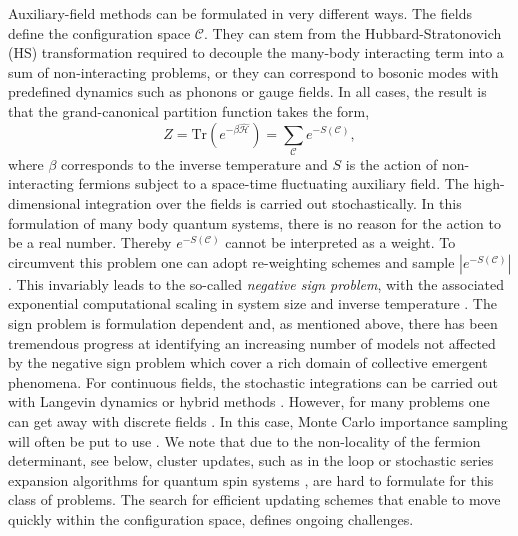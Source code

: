 Auxiliary-field methods  can be formulated in very different ways.  The fields define  the  configuration space $\mathcal{C}$. They can stem from the Hubbard-Stratonovich (HS)  \cite{Hubbard59} transformation required to decouple the  many-body interacting term into a sum of non-interacting problems,  or they can correspond to  bosonic modes with predefined dynamics such as phonons or gauge fields. In all cases, the result is that  the grand-canonical partition function  takes the form, 
\begin{equation}
	 Z = \text{Tr}\left( e^{-\beta \hat{\mathcal{H}}}\right)   =   \sum_{\mathcal{C}} e^{-S(\mathcal{C}) },
\end{equation}
where $\beta $ corresponds to the inverse temperature and $S$  is the action of non-interacting fermions subject to a  space-time fluctuating auxiliary field.    
The high-dimensional  integration  over the fields is carried out stochastically.  In this formulation of many  body quantum systems, there is no reason for the action to be a real number.  Thereby $e^{-S(\mathcal{C})}$ cannot be interpreted as a weight. To circumvent this problem one can adopt   re-weighting schemes and sample $| e^{-S(\mathcal{C})}| $. This invariably leads to the so-called \emph{negative sign problem}, with the associated exponential computational scaling in system size and inverse temperature \cite{Troyer05}.  The sign problem is formulation dependent and, as mentioned above, there has been tremendous progress at identifying an increasing number of models not affected by the negative sign problem which cover a rich domain of collective emergent phenomena.  
 For continuous fields, the stochastic integrations can  be carried out with Langevin  dynamics or hybrid methods \cite{Duane85}.   However, for many  problems one can get away with discrete fields \cite{Hirsch83}. In this case,  Monte Carlo importance sampling will often be put to use \cite{Sokal89}.  
We note that  due to  the non-locality of the fermion determinant, see below, cluster updates,  such as in the loop or stochastic series expansion algorithms
 for quantum spin systems  \cite{Evertz93,Sandvik99b,Sandvik02}, are hard to formulate for this class of problems.  The search for efficient updating schemes that enable to move quickly within the configuration space, defines ongoing challenges. 

